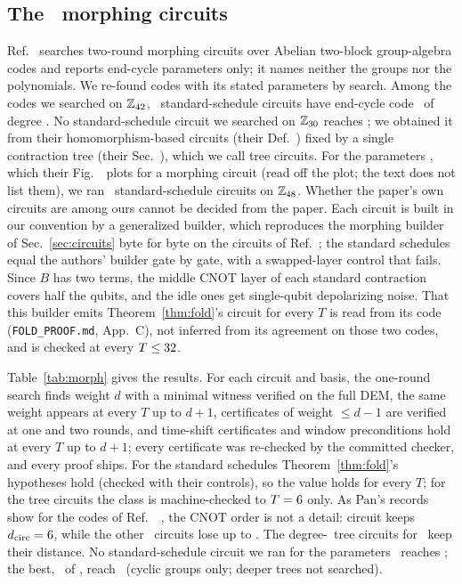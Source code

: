 \documentclass[aps,pra,twocolumn,superscriptaddress,nofootinbib,longbibliography,floatfix]{revtex4-2}
\newcommand{\dc}{d_{\mathrm{circ}}}
\begin{document}
\subsection{The \STbYear\ morphing circuits}
\label{sec:morph2026}

Ref.~\cite{shaw2026optimising} searches two-round morphing circuits over Abelian two-block group-algebra codes and reports end-cycle parameters only; it names neither the groups nor the polynomials. We re-found codes with its stated parameters by search. Among the codes we searched on $\mathbb Z_{42}$, \MtwoFortyTwoCircuits\ standard-schedule circuits have end-cycle code \MtwoCodeFortyTwo\ of degree \MtwoFortyTwoDegree. No standard-schedule circuit we searched on $\mathbb Z_{30}$ reaches \MtwoCodeThirty; we obtained it from their homomorphism-based circuits (their Def.~\STbDef) fixed by a single contraction tree (their Sec.~\STbTreeSec), which we call tree circuits. For the parameters \MtwoCodeFortyEight, which their Fig.~\STbFig\ plots for a morphing circuit (read off the plot; the text does not list them), we ran \MtwoFortyEightCount\ standard-schedule circuits on $\mathbb Z_{48}$. Whether the paper's own circuits are among ours cannot be decided from the paper. Each circuit is built in our convention by a generalized builder, which reproduces the morphing builder of Sec.~\ref{sec:circuits} byte for byte on the circuits of Ref.~\cite{shaw2024lowering}; the standard schedules equal the authors' builder gate by gate, with a swapped-layer control that fails. Since $B$ has two terms, the middle CNOT layer of each standard contraction covers half the qubits, and the idle ones get single-qubit depolarizing noise. That this builder emits Theorem~\ref{thm:fold}'s circuit for every $T$ is read from its code (\texttt{FOLD\_PROOF.md}, App.~C), not inferred from its agreement on those two codes, and is checked at every $T\le32$.

Table~\ref{tab:morph} gives the results. For each circuit and basis, the one-round search finds weight $d$ with a minimal witness verified on the full DEM, the same weight appears at every $T$ up to $d+1$, certificates of weight $\le d-1$ are verified at one and two rounds, and time-shift certificates and window preconditions hold at every $T$ up to $d+1$; every certificate was re-checked by the committed checker, and every proof ships. For the standard schedules Theorem~\ref{thm:fold}'s hypotheses hold (checked with their controls), so the value holds for every $T$; for the tree circuits the class is machine-checked to $T=6$ only. As Pan's records show for the codes of Ref.~\cite{shaw2024lowering}~\cite{pan2026e019}, the CNOT order is not a detail: circuit \texttt{\MtwoKeeper} keeps $\dc=\MtwoKeeperD$, while the other \MtwoCodeFortyTwo\ circuits lose up to \MtwoFortyTwoMaxLoss. The degree-\MtwoTreeDegree\ tree circuits for \MtwoCodeThirty\ keep their distance. No standard-schedule circuit we ran for the parameters \MtwoCodeFortyEight\ reaches \MtwoEndDFortyEight; the best, \MtwoFortyEightBestCount\ of \MtwoFortyEightCount, reach \MtwoBestFortyEight\ (cyclic groups only; deeper trees not searched).
\end{document}
